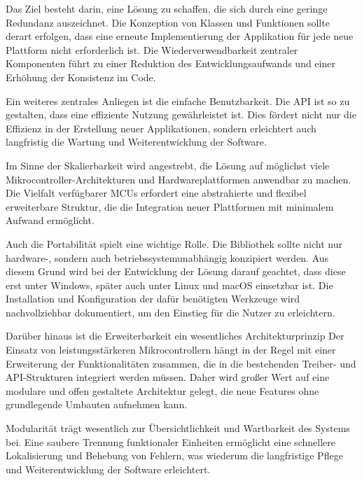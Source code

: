 Das Ziel besteht darin, eine Lösung zu schaffen, die sich durch eine geringe Redundanz auszeichnet. 
Die Konzeption von Klassen und Funktionen sollte derart erfolgen, dass eine erneute Implementierung der Applikation für jede neue Plattform nicht erforderlich ist.
Die Wiederverwendbarkeit zentraler Komponenten führt zu einer Reduktion des Entwicklungsaufwands und einer Erhöhung der Konsistenz im Code.

Ein weiteres zentrales Anliegen ist die einfache Benutzbarkeit. 
Die API ist so zu gestalten, dass eine effiziente Nutzung gewährleistet ist. 
Dies fördert nicht nur die Effizienz in der Erstellung neuer Applikationen, sondern erleichtert auch langfristig die Wartung und Weiterentwicklung der Software.

Im Sinne der Skalierbarkeit wird angestrebt, die Lösung auf möglichst viele Mikrocontroller-Architekturen und Hardwareplattformen anwendbar zu machen.
Die Vielfalt verfügbarer MCUs erfordert eine abstrahierte und flexibel erweiterbare Struktur, die die Integration neuer Plattformen mit minimalem Aufwand ermöglicht.

Auch die Portabilität spielt eine wichtige Rolle.
Die Bibliothek sollte nicht nur hardware-, sondern auch betriebssystemunabhängig konzipiert werden.
Aus diesem Grund wird bei der Entwicklung der Lösung darauf geachtet, dass diese erst unter Windows, später auch unter Linux und macOS einsetzbar ist.
Die Installation und Konfiguration der dafür benötigten Werkzeuge wird nachvollziehbar dokumentiert, um den Einstieg für die Nutzer zu erleichtern.

Darüber hinaus ist die Erweiterbarkeit ein wesentliches Architekturprinzip
Der Einsatz von leistungsstärkeren Mikrocontrollern hängt in der Regel mit einer Erweiterung der Funktionalitäten zusammen, die in die bestehenden Treiber- und API-Strukturen integriert werden müssen.
Daher wird großer Wert auf eine modulare und offen gestaltete Architektur gelegt, die neue Features ohne grundlegende Umbauten aufnehmen kann.

Modularität trägt wesentlich zur Übersichtlichkeit und Wartbarkeit des Systems bei. 
Eine saubere Trennung funktionaler Einheiten ermöglicht eine schnellere Lokalisierung und Behebung von Fehlern, was wiederum die langfristige Pflege und Weiterentwicklung der Software erleichtert.

